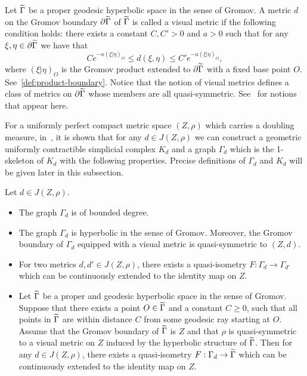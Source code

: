 \documentclass[AHL,Unicode,longabstracts,published]{cedram}
\let\oldtilde\tilde
\renewcommand*{\tilde}[1]{\mathchoice{\widetilde{#1}}{\widetilde{#1}}{\oldtilde{#1}}{\oldtilde{#1}}}
\begin{document}
\begin{defi}\label{df:visual}
Let $\tilde{\Gamma}$ be a proper geodesic hyperbolic space in the sense of Gromov. A metric $d$ on the Gromov boundary $\partial\tilde{\Gamma}$ of $\tilde{\Gamma}$ is called a visual metric if the following condition holds: there exists a constant $C,C'>0$ and $a>0$ such that for any $\xi,\eta\in\partial\tilde{\Gamma}$ we have that
\[
Ce^{-a(\xi|\eta)_O}\leq d(\xi,\eta)\leq C'e^{-a(\xi|\eta)_O},
\]
where $(\xi|\eta)_O$ is the Gromov product extended to $\partial\tilde{\Gamma}$ with a fixed base point $O$. See~\eqref{def:product-boundary}. Notice that the notion of visual metrics defines a class of metrics on $\partial\tilde{\Gamma}$ whose members are all quasi-symmetric. See~\cite{GH} for notions that appear here.
\end{defi}

For a uniformly perfect compact metric space $(Z,\rho)$ which carries a doubling measure, in~\cite{BP}, it is shown that for any $d\in J(Z,\rho)$ we can construct a geometric uniformly contractible simplicial complex $K_{d}$ and a graph $\Gamma_d$ which is the 1-skeleton of $K_d$ with the following properties. Precise definitions of $\Gamma_d$ and $K_d$ will be given later in this subsection.

\begin{theo}\label{hf}
Let $d\in J(Z,\rho)$.
\begin{itemize}
\item The graph $\Gamma_{d}$ is of bounded degree.
\item The graph $\Gamma_{d}$ is hyperbolic in the sense of Gromov. Moreover, the Gromov boundary of $\Gamma_d$ equipped with a visual metric is quasi-symmetric to $(Z,d)$.
\item For two metrics $d,d'\in J(Z,\rho)$, there exists a quasi-isometry $F:\Gamma_{d}\rightarrow \Gamma_{d'}$ which can be continuously extended to the identity map on $Z$.
\item Let $\tilde{\Gamma}$ be a proper and geodesic hyperbolic space in the sense of Gromov. Suppose that there exists a point $O\in \tilde{\Gamma}$ and a constant $C\geq0$, such that all points in $\tilde{\Gamma}$ are within distance $C$ from some geodesic ray starting at $O$. Assume that the Gromov boundary of $\tilde{\Gamma}$ is $Z$ and that $\rho$ is quasi-symmetric to a visual metric on $Z$ induced by the hyperbolic structure of $\tilde{\Gamma}$. Then for any $d\in J(Z,\rho)$, there exists a quasi-isometry $F:\Gamma_{d}\rightarrow \tilde{\Gamma}$ which can be continuously extended to the identity map on $Z$.
\end{itemize}
\end{theo}
\end{document}
